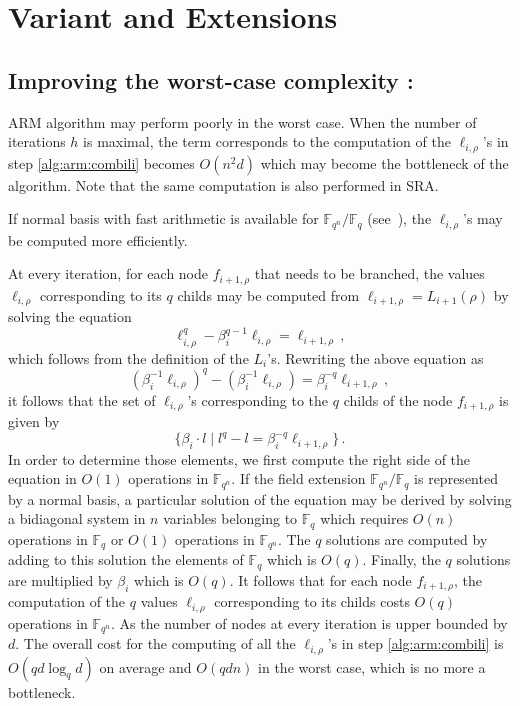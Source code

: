 \documentclass{sig-alternate}
\newcommand{\ff}[1]{\mathbb{F}_{#1}}
\newcommand{\dd}{d}
\newcommand{\qq}{q}
\newcommand{\nn}{n}
\newcommand{\qn}{{\qq^\nn}}
\newcommand{\basef}{\ff{\qq}}
\newcommand{\extf}{\ff{\qn}}
\newcommand{\bigO}{O}
\newcounter{algo}
\begin{document}
 
 
 
 
 
 
 
 
 
 
 
 
 
 
 
 
 
\section{Variant and Extensions}


 
\subsection{Improving the worst-case complexity \label{sec:ext:variant}:} 

\label{alg:sra}

\label{alg:sra:combili} 


ARM algorithm may perform poorly in the worst case. When the number of iterations $h$ is maximal, 
the term corresponds to the computation of the $\ell_{i,\rho}$'s in step \ref{alg:arm:combili} becomes $\bigO(\nn^2 \dd)$ which may become the bottleneck of the algorithm. 
Note that the same computation is also performed in SRA.

If normal basis with fast arithmetic is available for $\extf/\basef$ (see~\cite{Couveignes-Lercier}), the  $\ell_{i,\rho}$'s  may be computed more efficiently.

At every iteration, for each node $f_{i+1,\rho}$ that needs to be branched, the values $\ell_{i,\rho}$ corresponding to its $\qq$ childs may be computed from $\ell_{i+1,\rho}=L_{i+1}(\rho)$ by solving the equation  
$$\ell_{i,\rho}^q-\beta_i^{\qq-1} \ell_{i,\rho}=\ell_{i+1,\rho}\,,$$
which follows from the definition of the $L_i$'s. Rewriting the above equation as 
$$(\beta_i^{-1}\ell_{i,\rho})^q-(\beta_i^{-1}\ell_{i,\rho})=\beta_i^{-q}\ell_{i+1,\rho}\,,$$
it follows that the set of $\ell_{i,\rho}$'s corresponding to the $\qq$ childs of the node $f_{i+1,\rho}$ is given by 
$$\{ \beta_i \cdot l \mid l^q-l=\beta_i^{-q}\ell_{i+1,\rho} \} \,.$$
In order to determine those elements, we first compute the right side of the equation in $O(1)$ operations in $\extf$. If the field extension $\extf/\basef$ is represented by a normal basis, a particular solution of the equation may be derived by solving a bidiagonal system in $n$ variables belonging to $\basef$ which requires $\bigO(\nn)$ operations in $\basef$ or $O(1)$ operations in $\extf$. The $\qq$ solutions are computed by adding to this solution the elements of $\basef$ which is $\bigO(\qq)$.    Finally, the $\qq$ solutions are multiplied by $\beta_i$ which is $\bigO(q)$. It follows that for each node $f_{i+1,\rho}$, the computation of the $\qq$ values $\ell_{i,\rho}$ corresponding to its childs costs $\bigO(q)$ operations in $\extf$. As the number of nodes at every iteration is upper bounded by $\dd$. The overall cost for the computing of all the $\ell_{i,\rho}$'s in step \ref{alg:arm:combili}  is $O(\qq \dd \log_\qq \dd)$ on average and $O(\qq \dd \nn)$ in the worst case, which is no more a bottleneck.
\end{document}
